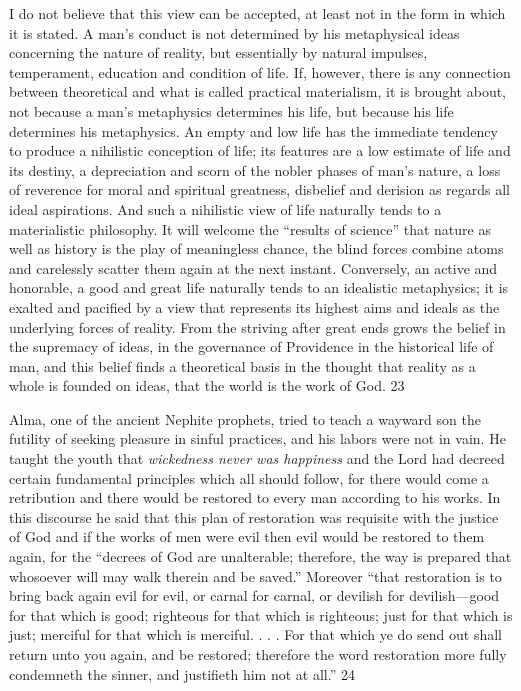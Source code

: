 I do not believe that this view can be accepted, at least not in the form in which it is stated. A
man's conduct is not determined by his metaphysical ideas concerning the nature of reality,
but essentially by natural impulses, temperament, education and condition of life. If,
however, there is any connection between theoretical and what is called practical
materialism, it is brought about, not because a man's metaphysics determines his life, but
because his life determines his metaphysics. An empty and low life has the immediate
tendency to produce a nihilistic conception of life; its features are a low estimate of life and
its destiny, a depreciation and scorn of the nobler phases of man's nature, a loss of reverence
for moral and spiritual greatness, disbelief and derision as regards all ideal aspirations. And
such a nihilistic view of life naturally tends to a materialistic philosophy. It will welcome the
``results of science'' that nature as well as history is the play of meaningless chance, the blind
forces combine atoms and carelessly scatter them again at the next instant. Conversely, an
active and honorable, a good and great life naturally tends to an idealistic metaphysics; it is
exalted and pacified by a view that represents its highest aims and ideals as the underlying
forces of reality. From the striving after great ends grows the belief in the supremacy of
ideas, in the governance of Providence in the historical life of man, and this belief finds a
theoretical basis in the thought that reality as a whole is founded on ideas, that the world is
the work of God. 23

Alma, one of the ancient Nephite prophets, tried to teach a wayward son the futility of
seeking pleasure in sinful practices, and his labors were not in vain. He taught the youth that
\textit{wickedness never was happiness} and the Lord had decreed certain fundamental principles
which all should follow, for there would come a retribution and there would be restored to
every man according to his works. In this discourse he said that this plan of restoration was
requisite with the justice of God and if the works of men were evil then evil would be
restored to them again, for the ``decrees of God are unalterable; therefore, the way is prepared
that whosoever will may walk therein and be saved.'' Moreover ``that restoration is to bring
back again evil for evil, or carnal for carnal, or devilish for devilish—good for that which is
good; righteous for that which is righteous; just for that which is just; merciful for that which
is merciful. . . . For that which ye do send out shall return unto you again, and be restored;
therefore the word restoration more fully condemneth the sinner, and justifieth him not at
all.'' 24

